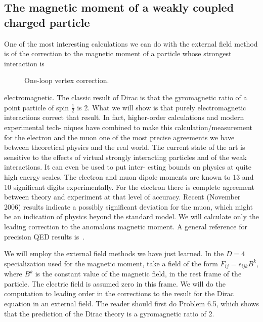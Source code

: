 \subsection{The magnetic moment of a weakly coupled charged particle}

One of the most interesting calculations we can do with the external field method is
of the correction to the magnetic moment of a particle whose strongest interaction is

\begin{figure}[htbp]
  \centering
  
  \caption{One-loop vertex correction.}
  \label{fig:6.4}
\end{figure}

electromagnetic. The classic result of Dirac is that the gyromagnetic ratio of a point
particle of spin $\frac12$ is 2. What we will show is that purely electromagnetic interactions
correct that result. In fact, higher-order calculations and modern experimental tech-
niques have combined to make this calculation/measurement for the electron and the
muon one of the most precise agreements we have between theoretical physics and the
real world. The current state of the art is sensitive to the effects of virtual strongly
interacting particles and of the weak interactions. It can even be used to put inter-
esting bounds on physics at quite high energy scales. The electron and muon dipole
moments are known to 13 and 10 significant digits experimentally. For the electron
there is complete agreement between theory and experiment at that level of accuracy.
Recent (November 2006) results indicate a possibly significant deviation for the muon,
which might be an indication of physics beyond the standard model. We will calculate
only the leading correction to the anomalous magnetic moment. A general reference
for precision QED results is~\cite{banks-ref-34}.

We will employ the external field methods we have just learned. In the $D=4$
specialization used for the magnetic moment, take a field of the form
$F_{ij}=\epsilon_{ijk}B^k$, where $B^k$ is the constant value of the magnetic field,
in the rest frame of the particle. The electric field is assumed zero in this frame. We
will do the computation to leading order in the corrections to the result for the Dirac
equation in an external field. The reader should first do Problem 6.5, which shows that
the prediction of the Dirac theory is a gyromagnetic ratio of 2.


